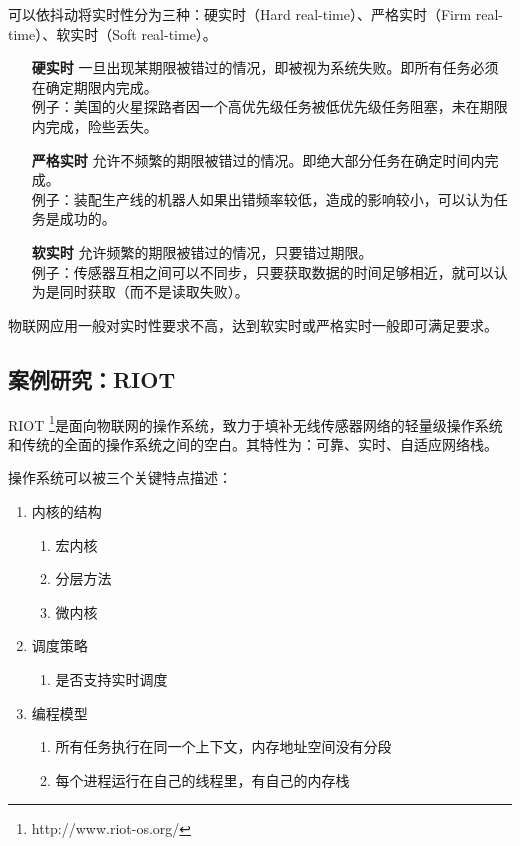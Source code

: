 \documentclass{ctexart}
\begin{document}
可以依抖动将实时性分为三种：硬实时（Hard real-time）、严格实时（Firm real-time）、软实时（Soft real-time）。

\begin{itemize}
	\item[\textbf{硬实时}] 一旦出现某期限被错过的情况，即被视为系统失败。即所有任务必须在确定期限内完成。\\
	例子：美国的火星探路者因一个高优先级任务被低优先级任务阻塞，未在期限内完成，险些丢失。
	\item[\textbf{严格实时}] 允许不频繁的期限被错过的情况。即绝大部分任务在确定时间内完成。\\
	例子：装配生产线的机器人如果出错频率较低，造成的影响较小，可以认为任务是成功的。
	\item[\textbf{软实时}] 允许频繁的期限被错过的情况，只要错过期限。\\
	例子：传感器互相之间可以不同步，只要获取数据的时间足够相近，就可以认为是同时获取（而不是读取失败）。
\end{itemize}

物联网应用一般对实时性要求不高，达到软实时或严格实时一般即可满足要求。

\subsection{案例研究：RIOT}

RIOT \footnote{http://www.riot-os.org/}是面向物联网的操作系统，致力于填补无线传感器网络的轻量级操作系统和传统的全面的操作系统之间的空白。其特性为：可靠、实时、自适应网络栈。

操作系统可以被三个关键特点描述：

\begin{enumerate}
	\item 内核的结构
	\begin{enumerate}
		\item 宏内核
		\item 分层方法
		\item 微内核
	\end{enumerate}
	\item 调度策略
	\begin{enumerate}
		\item 是否支持实时调度
	\end{enumerate}
	\item 编程模型
	\begin{enumerate}
		\item 所有任务执行在同一个上下文，内存地址空间没有分段
		\item 每个进程运行在自己的线程里，有自己的内存栈
	\end{enumerate}
\end{enumerate}
\end{document}
